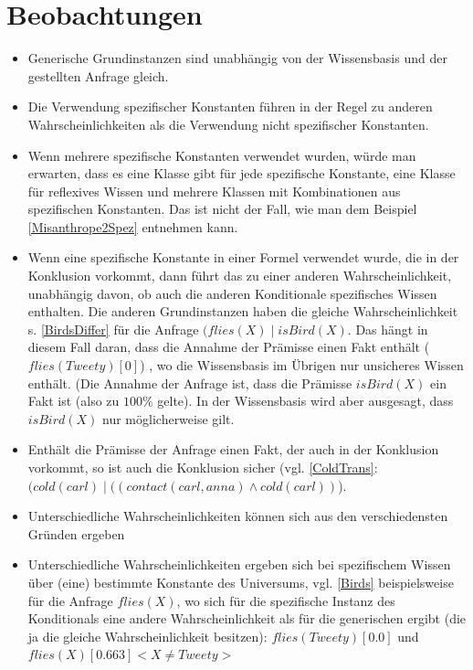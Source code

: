 \documentclass[a4paper, 11pt]{book}
\begin{document}
\section{Beobachtungen}

	\begin{itemize}
		\item 	Generische Grundinstanzen  sind unabhängig von der Wissensbasis und der gestellten Anfrage gleich.
		\item Die Verwendung spezifischer Konstanten   führen in der Regel zu anderen Wahrscheinlichkeiten als die Verwendung nicht spezifischer Konstanten.
			\item Wenn mehrere spezifische Konstanten verwendet wurden, würde man erwarten, dass es eine Klasse gibt für jede spezifische Konstante, eine Klasse für reflexives Wissen und mehrere Klassen mit Kombinationen aus spezifischen Konstanten. Das ist nicht der Fall, wie man dem Beispiel \ref{Misanthrope2Spez} entnehmen kann.
		\item Wenn eine spezifische Konstante in einer Formel verwendet wurde, die in der Konklusion vorkommt, dann führt das zu einer anderen Wahrscheinlichkeit, unabhängig davon, ob auch die anderen Konditionale spezifisches Wissen enthalten. Die anderen Grundinstanzen haben die gleiche Wahrscheinlichkeit s. \ref{BirdsDiffer} für die Anfrage $ (flies(X) \mid isBird(X)$. Das hängt in diesem Fall daran, dass die Annahme der Prämisse einen Fakt enthält ($ flies(Tweety)[0] $) , wo die Wissensbasis im Übrigen nur unsicheres Wissen enthält. (Die Annahme der Anfrage ist, dass die Prämisse $isBird(X)$ ein Fakt ist (also zu $ 100\% $ gelte). In der Wissensbasis wird aber ausgesagt, dass $isBird(X)$ nur möglicherweise gilt.
		\item Enthält die Prämisse der Anfrage einen Fakt, der auch in der Konklusion vorkommt, so ist auch die Konklusion sicher (vgl. \ref{ColdTrans}:$(cold(carl) \mid ((contact(carl,anna)  \land cold(carl)) $). 
		\item Unterschiedliche Wahrscheinlichkeiten können sich aus den verschiedensten Gründen ergeben
		\item Unterschiedliche Wahrscheinlichkeiten ergeben sich bei spezifischem Wissen über (eine) bestimmte Konstante des Universums, vgl. \ref{Birds} beispielsweise für die Anfrage $ flies(X) $, wo sich für die spezifische Instanz des Konditionals eine andere Wahrscheinlichkeit als für die generischen ergibt (die ja die gleiche Wahrscheinlichkeit besitzen): $ flies(Tweety)[0.0] $ und $ flies(X)[0.663]<X \neq Tweety> $

\end{itemize}
\end{document}
